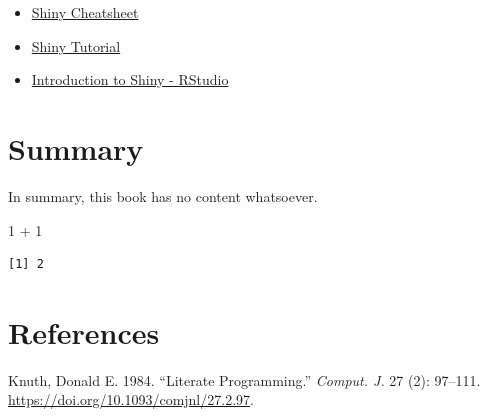 \documentclass[
  letterpaper,
  DIV=11,
  numbers=noendperiod]{scrreprt}
\newenvironment{Shaded}{\begin{snugshade}}{\end{snugshade}}
\newcommand{\DecValTok}[1]{\textcolor[rgb]{0.68,0.00,0.00}{#1}}
\newcommand{\SpecialCharTok}[1]{\textcolor[rgb]{0.37,0.37,0.37}{#1}}
\providecommand{\tightlist}{%
  \setlength{\itemsep}{0pt}\setlength{\parskip}{0pt}}\usepackage{longtable,booktabs,array}
\newlength{\cslhangindent}
\newlength{\cslentryspacingunit} %
\newenvironment{CSLReferences}[2] %
 {%
  \setlength{\parindent}{0pt}
  \ifodd #1
  \let\oldpar\par
  \def\par{\hangindent=\cslhangindent\oldpar}
  \fi
  \setlength{\parskip}{#2\cslentryspacingunit}
 }%
 {}
\begin{document}

\begin{itemize}
\tightlist
\item
  \href{https://shiny.rstudio.com/articles/cheatsheet.html}{Shiny
  Cheatsheet}
\item
  \href{https://shiny.rstudio.com/tutorial/}{Shiny Tutorial}
\item
  \href{https://www.rstudio.com/resources/webinars/introduction-to-shiny/}{Introduction
  to Shiny - RStudio}
\end{itemize}


\hypertarget{summary}{%
\chapter{Summary}\label{summary}}

In summary, this book has no content whatsoever.

\begin{Shaded}
\begin{Highlighting}[]
\DecValTok{1} \SpecialCharTok{+} \DecValTok{1}
\end{Highlighting}
\end{Shaded}

\begin{verbatim}
[1] 2
\end{verbatim}


\hypertarget{references}{%
\chapter*{References}\label{references}}


\hypertarget{refs}{}
\begin{CSLReferences}{1}{0}
\leavevmode{}%
Knuth, Donald E. 1984. {``Literate Programming.''} \emph{Comput. J.} 27
(2): 97--111. \url{https://doi.org/10.1093/comjnl/27.2.97}.

\end{CSLReferences}
\end{document}
